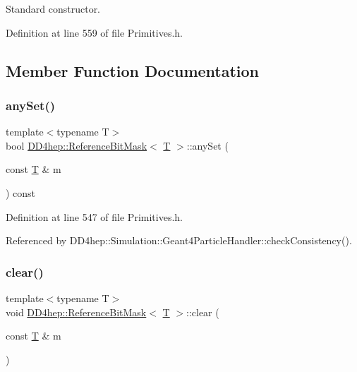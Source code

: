 Standard constructor. 



Definition at line 559 of file Primitives.\+h.



\subsection{Member Function Documentation}
\hypertarget{class_d_d4hep_1_1_reference_bit_mask_a91802e95b2585e21742521a6734cee44}{}\label{class_d_d4hep_1_1_reference_bit_mask_a91802e95b2585e21742521a6734cee44} 
\subsubsection{\texorpdfstring{any\+Set()}{anySet()}}
{\footnotesize\ttfamily template$<$typename T$>$ \\
bool \hyperlink{class_d_d4hep_1_1_reference_bit_mask}{D\+D4hep\+::\+Reference\+Bit\+Mask}$<$ \hyperlink{class_t}{T} $>$\+::any\+Set (\begin{DoxyParamCaption}\item[{const \hyperlink{class_t}{T} \&}]{m }\end{DoxyParamCaption}) const\hspace{0.3cm}{\ttfamily [inline]}}



Definition at line 547 of file Primitives.\+h.



Referenced by D\+D4hep\+::\+Simulation\+::\+Geant4\+Particle\+Handler\+::check\+Consistency().

\hypertarget{class_d_d4hep_1_1_reference_bit_mask_a3c384d81d710f444161e1f8cbf9420ae}{}\label{class_d_d4hep_1_1_reference_bit_mask_a3c384d81d710f444161e1f8cbf9420ae} 
\subsubsection{\texorpdfstring{clear()}{clear()}\hspace{0.1cm}{\footnotesize\ttfamily [1/2]}}
{\footnotesize\ttfamily template$<$typename T$>$ \\
void \hyperlink{class_d_d4hep_1_1_reference_bit_mask}{D\+D4hep\+::\+Reference\+Bit\+Mask}$<$ \hyperlink{class_t}{T} $>$\+::clear (\begin{DoxyParamCaption}\item[{const \hyperlink{class_t}{T} \&}]{m }\end{DoxyParamCaption})\hspace{0.3cm}{\ttfamily [inline]}}



